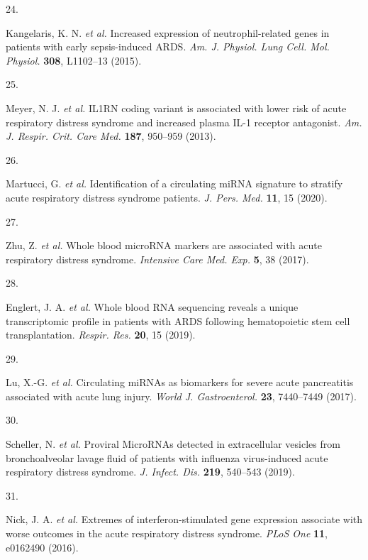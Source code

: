 \documentclass[
  11,
  a4paper,
]{article}
\newlength{\cslhangindent}
\newlength{\csllabelwidth}
\newlength{\cslentryspacingunit} %
\newenvironment{CSLReferences}[2] %
 {%
  \setlength{\parindent}{0pt}
  \ifodd #1
  \let\oldpar\par
  \def\par{\hangindent=\cslhangindent\oldpar}
  \fi
  \setlength{\parskip}{#2\cslentryspacingunit}
 }%
 {}
\newcommand{\CSLLeftMargin}[1]{\parbox[t]{\csllabelwidth}{#1}}
\newcommand{\CSLRightInline}[1]{\parbox[t]{\linewidth - \csllabelwidth}{#1}\break}
\begin{document}
\begin{CSLReferences}{0}{0}
\leavevmode{}%
\CSLLeftMargin{24. }%
\CSLRightInline{Kangelaris, K. N. \emph{et al.} Increased expression of
neutrophil-related genes in patients with early sepsis-induced {ARDS}.
\emph{Am. J. Physiol. Lung Cell. Mol. Physiol.} \textbf{308}, L1102--13
(2015).}

\leavevmode{}%
\CSLLeftMargin{25. }%
\CSLRightInline{Meyer, N. J. \emph{et al.} {IL1RN} coding variant is
associated with lower risk of acute respiratory distress syndrome and
increased plasma {IL-1} receptor antagonist. \emph{Am. J. Respir. Crit.
Care Med.} \textbf{187}, 950--959 (2013).}

\leavevmode{}%
\CSLLeftMargin{26. }%
\CSLRightInline{Martucci, G. \emph{et al.} Identification of a
circulating {miRNA} signature to stratify acute respiratory distress
syndrome patients. \emph{J. Pers. Med.} \textbf{11}, 15 (2020).}

\leavevmode{}%
\CSLLeftMargin{27. }%
\CSLRightInline{Zhu, Z. \emph{et al.} Whole blood {microRNA} markers are
associated with acute respiratory distress syndrome. \emph{Intensive
Care Med. Exp.} \textbf{5}, 38 (2017).}

\leavevmode{}%
\CSLLeftMargin{28. }%
\CSLRightInline{Englert, J. A. \emph{et al.} Whole blood {RNA}
sequencing reveals a unique transcriptomic profile in patients with
{ARDS} following hematopoietic stem cell transplantation. \emph{Respir.
Res.} \textbf{20}, 15 (2019).}

\leavevmode{}%
\CSLLeftMargin{29. }%
\CSLRightInline{Lu, X.-G. \emph{et al.} Circulating {miRNAs} as
biomarkers for severe acute pancreatitis associated with acute lung
injury. \emph{World J. Gastroenterol.} \textbf{23}, 7440--7449 (2017).}

\leavevmode{}%
\CSLLeftMargin{30. }%
\CSLRightInline{Scheller, N. \emph{et al.} Proviral {MicroRNAs} detected
in extracellular vesicles from bronchoalveolar lavage fluid of patients
with influenza virus-induced acute respiratory distress syndrome.
\emph{J. Infect. Dis.} \textbf{219}, 540--543 (2019).}

\leavevmode{}%
\CSLLeftMargin{31. }%
\CSLRightInline{Nick, J. A. \emph{et al.} Extremes of
interferon-stimulated gene expression associate with worse outcomes in
the acute respiratory distress syndrome. \emph{PLoS One} \textbf{11},
e0162490 (2016).}


\end{CSLReferences}
\end{document}
